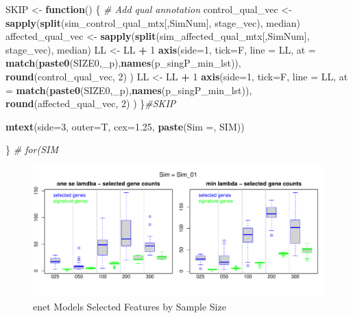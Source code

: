 \documentclass[
]{book}
\newenvironment{Shaded}{\begin{snugshade}}{\end{snugshade}}
\newcommand{\CommentTok}[1]{\textcolor[rgb]{0.56,0.35,0.01}{\textit{#1}}}
\newcommand{\ControlFlowTok}[1]{\textcolor[rgb]{0.13,0.29,0.53}{\textbf{#1}}}
\newcommand{\DataTypeTok}[1]{\textcolor[rgb]{0.13,0.29,0.53}{#1}}
\newcommand{\DecValTok}[1]{\textcolor[rgb]{0.00,0.00,0.81}{#1}}
\newcommand{\FloatTok}[1]{\textcolor[rgb]{0.00,0.00,0.81}{#1}}
\newcommand{\KeywordTok}[1]{\textcolor[rgb]{0.13,0.29,0.53}{\textbf{#1}}}
\newcommand{\NormalTok}[1]{#1}
\newcommand{\OperatorTok}[1]{\textcolor[rgb]{0.81,0.36,0.00}{\textbf{#1}}}
\newcommand{\StringTok}[1]{\textcolor[rgb]{0.31,0.60,0.02}{#1}}
\begin{document}
\begin{Shaded}
\begin{Highlighting}[]
\NormalTok{SKIP  <{-}}\StringTok{ }\ControlFlowTok{function}\NormalTok{() \{}
\CommentTok{\# Add qual annotation}
\NormalTok{control\_qual\_vec <{-}}\StringTok{ }\KeywordTok{sapply}\NormalTok{(}\KeywordTok{split}\NormalTok{(sim\_control\_qual\_mtx[,SimNum], stage\_vec), median)}
\NormalTok{affected\_qual\_vec <{-}}\StringTok{ }\KeywordTok{sapply}\NormalTok{(}\KeywordTok{split}\NormalTok{(sim\_affected\_qual\_mtx[,SimNum], stage\_vec), median)}
\NormalTok{LL <{-}}\StringTok{ }\NormalTok{LL }\OperatorTok{+}\StringTok{ }\DecValTok{1}
\KeywordTok{axis}\NormalTok{(}\DataTypeTok{side=}\DecValTok{1}\NormalTok{, }\DataTypeTok{tick=}\NormalTok{F, }\DataTypeTok{line =}\NormalTok{ LL,}
  \DataTypeTok{at =}  \KeywordTok{match}\NormalTok{(}\KeywordTok{paste0}\NormalTok{(SIZE0,}\StringTok{\textquotesingle{}\_p\textquotesingle{}}\NormalTok{),}\KeywordTok{names}\NormalTok{(p\_singP\_min\_lst)),}
  \KeywordTok{round}\NormalTok{(control\_qual\_vec, }\DecValTok{2}\NormalTok{)}
\NormalTok{ )}
\NormalTok{LL <{-}}\StringTok{ }\NormalTok{LL }\OperatorTok{+}\StringTok{ }\DecValTok{1}
\KeywordTok{axis}\NormalTok{(}\DataTypeTok{side=}\DecValTok{1}\NormalTok{, }\DataTypeTok{tick=}\NormalTok{F, }\DataTypeTok{line =}\NormalTok{ LL,}
  \DataTypeTok{at =}  \KeywordTok{match}\NormalTok{(}\KeywordTok{paste0}\NormalTok{(SIZE0,}\StringTok{\textquotesingle{}\_p\textquotesingle{}}\NormalTok{),}\KeywordTok{names}\NormalTok{(p\_singP\_min\_lst)),}
  \KeywordTok{round}\NormalTok{(affected\_qual\_vec, }\DecValTok{2}\NormalTok{)}
\NormalTok{ )}
\NormalTok{\}}\CommentTok{\#SKIP}

\KeywordTok{mtext}\NormalTok{(}\DataTypeTok{side=}\DecValTok{3}\NormalTok{, }\DataTypeTok{outer=}\NormalTok{T, }\DataTypeTok{cex=}\FloatTok{1.25}\NormalTok{, }\KeywordTok{paste}\NormalTok{(}\StringTok{\textquotesingle{}Sim =\textquotesingle{}}\NormalTok{,  SIM))}

\NormalTok{\} }\CommentTok{\# for(SIM}
\end{Highlighting}
\end{Shaded}

\begin{figure}
\centering
\includegraphics{Static/figures/enet-simRes-features-bySim-1.pdf}
\caption{\label{fig:enet-simRes-features-bySim}enet Models Selected Features by Sample Size}
\end{figure}
\end{document}

